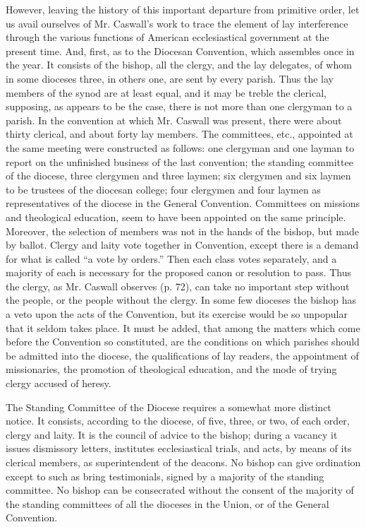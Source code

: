 However, leaving the history of this important
departure from primitive order, let us avail ourselves of Mr. Caswall's
work to trace the element of lay interference through the various
functions of American ecclesiastical government at the present time.
And, first, as to the Diocesan Convention, which assembles once in the
year. It consists of the bishop, all the clergy, and the lay
delegates, of whom in some dioceses three, in others one, are sent by
every parish. Thus the lay members of the synod are at least equal,
and it may be treble the clerical, supposing, as appears to be the
case, there is not more than one clergyman to a parish. In the
convention at which Mr. Caswall was present, there were about thirty
clerical, and about forty lay members. The committees, etc., appointed
at the same meeting were constructed as follows: one clergyman and one
layman to report on the unfinished business of the last convention;
the standing committee of the diocese, three clergymen and three
laymen; six clergymen and six laymen to be trustees of the diocesan
college; four clergymen and four laymen as representatives of the
diocese in the General Convention. Committees on missions and
theological education, seem to have been appointed on the same
principle. Moreover, the selection of members was not in the hands of
the bishop, but made by ballot. Clergy and laity vote together in
Convention, except there is a demand for what is called ``a vote by
orders.'' Then each class votes separately, and a majority of each is
necessary for the proposed canon or resolution to pass. Thus the
clergy, as Mr. Caswall observes (p. 72), can take no important step
without the people, or the people without the clergy. In some
few dioceses the bishop has a veto upon the acts of the Convention,
but its exercise would be so unpopular that it seldom takes place. It
must be added, that among the matters which come before the Convention
so constituted, are the conditions on which parishes should be
admitted into the diocese, the qualifications of lay readers, the
appointment of missionaries, the promotion of theological education,
and the mode of trying clergy accused of heresy.

The Standing Committee of the Diocese requires a
somewhat more distinct notice. It consists, according to the diocese,
of five, three, or two, of each order, clergy and laity. It is the
council of advice to the bishop; during a vacancy it issues dismissory
letters, institutes ecclesiastical trials, and acts, by means of its
clerical members, as superintendent of the deacons. No bishop can give
ordination except to such as bring testimonials, signed by a majority
of the standing committee. No bishop can be consecrated without the
consent of the majority of the standing committees of all the dioceses
in the Union, or of the General Convention.

